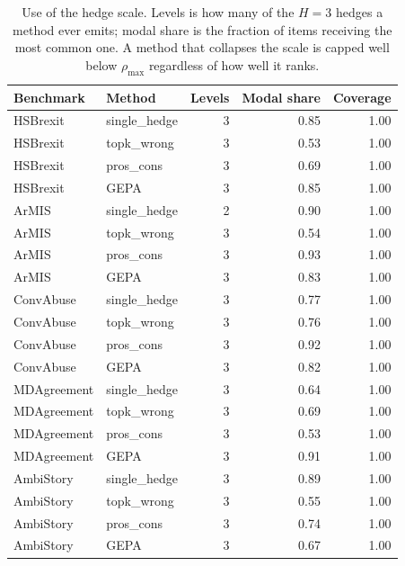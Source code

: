 \begin{table}[t]
\centering
\small
\begin{tabular}{llrrr}
\hline
Benchmark & Method & Levels & Modal share & Coverage \\
\hline
HSBrexit & single\_hedge & 3 & 0.85 & 1.00 \\
HSBrexit & topk\_wrong & 3 & 0.53 & 1.00 \\
HSBrexit & pros\_cons & 3 & 0.69 & 1.00 \\
HSBrexit & GEPA & 3 & 0.85 & 1.00 \\
ArMIS & single\_hedge & 2 & 0.90 & 1.00 \\
ArMIS & topk\_wrong & 3 & 0.54 & 1.00 \\
ArMIS & pros\_cons & 3 & 0.93 & 1.00 \\
ArMIS & GEPA & 3 & 0.83 & 1.00 \\
ConvAbuse & single\_hedge & 3 & 0.77 & 1.00 \\
ConvAbuse & topk\_wrong & 3 & 0.76 & 1.00 \\
ConvAbuse & pros\_cons & 3 & 0.92 & 1.00 \\
ConvAbuse & GEPA & 3 & 0.82 & 1.00 \\
MDAgreement & single\_hedge & 3 & 0.64 & 1.00 \\
MDAgreement & topk\_wrong & 3 & 0.69 & 1.00 \\
MDAgreement & pros\_cons & 3 & 0.53 & 1.00 \\
MDAgreement & GEPA & 3 & 0.91 & 1.00 \\
AmbiStory & single\_hedge & 3 & 0.89 & 1.00 \\
AmbiStory & topk\_wrong & 3 & 0.55 & 1.00 \\
AmbiStory & pros\_cons & 3 & 0.74 & 1.00 \\
AmbiStory & GEPA & 3 & 0.67 & 1.00 \\
\hline
\end{tabular}
\caption{Use of the hedge scale. Levels is how many of the $H=3$ hedges a method ever emits; modal share is the fraction of items receiving the most common one. A method that collapses the scale is capped well below $\rho_{\max}$ regardless of how well it ranks.}
\label{tab:stability}
\end{table}